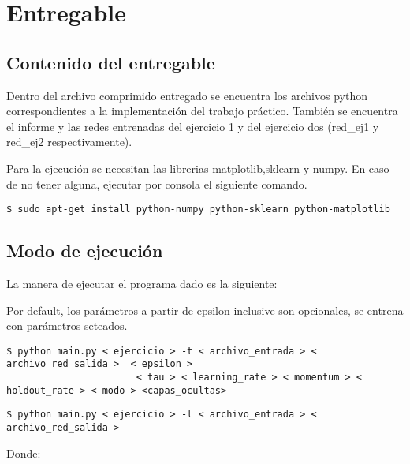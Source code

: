 \section{Entregable}
\subsection{Contenido del entregable}

Dentro del archivo comprimido entregado se encuentra los archivos python correspondientes a la implementación del trabajo práctico. También se encuentra el informe y las redes entrenadas del ejercicio 1 y del ejercicio dos (red\_ej1 y red\_ej2 respectivamente).

Para la ejecuci\'on se necesitan las librerias matplotlib,sklearn y numpy.
En caso de no tener alguna, ejecutar por consola el siguiente comando.

\begin{verbatim}
$ sudo apt-get install python-numpy python-sklearn python-matplotlib
\end{verbatim}

\subsection{Modo de ejecución}

La manera de ejecutar el programa dado es la siguiente:

Por default, los parámetros a partir de epsilon inclusive son opcionales, se entrena con parámetros seteados.

\begin{verbatim}
$ python main.py < ejercicio > -t < archivo_entrada > < archivo_red_salida >  < epsilon > 
                       < tau > < learning_rate > < momentum > < holdout_rate > < modo > <capas_ocultas> 
\end{verbatim}
\begin{verbatim}
$ python main.py < ejercicio > -l < archivo_entrada > < archivo_red_salida > 
\end{verbatim}

Donde:

